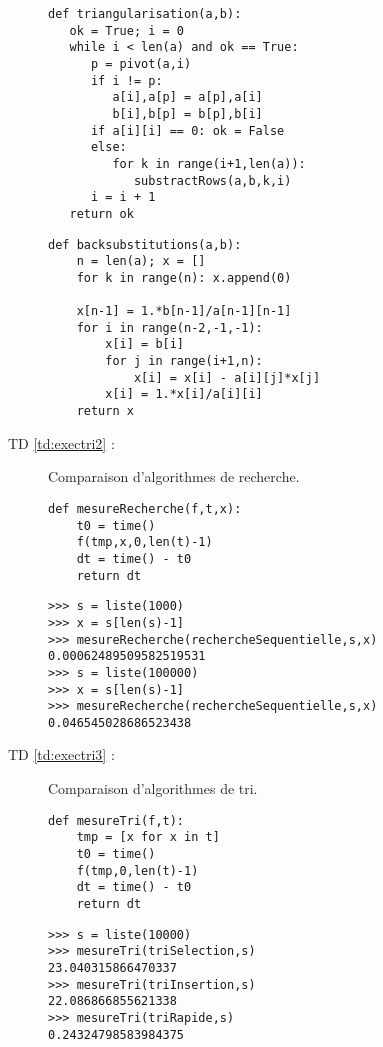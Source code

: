 \begin{description}
\begin{py}{6cm}
\begin{verbatim}
def triangularisation(a,b):
   ok = True; i = 0
   while i < len(a) and ok == True:
      p = pivot(a,i)
      if i != p:
         a[i],a[p] = a[p],a[i]
         b[i],b[p] = b[p],b[i]
      if a[i][i] == 0: ok = False
      else:
         for k in range(i+1,len(a)):
            substractRows(a,b,k,i)
      i = i + 1
   return ok
\end{verbatim}
\end{py}
\hfill
\begin{py}{6cm}
\begin{verbatim}
def backsubstitutions(a,b):
    n = len(a); x = []
    for k in range(n): x.append(0)
    
    x[n-1] = 1.*b[n-1]/a[n-1][n-1]
    for i in range(n-2,-1,-1): 
        x[i] = b[i]
        for j in range(i+1,n):
            x[i] = x[i] - a[i][j]*x[j]
        x[i] = 1.*x[i]/a[i][i]
    return x
\end{verbatim}
\end{py}
\vspace*{2mm}

\item[TD \ref{td:exectri2} :] Comparaison d'algorithmes de recherche.

\begin{py}{4cm}
\begin{verbatim}
def mesureRecherche(f,t,x):
    t0 = time()
    f(tmp,x,0,len(t)-1)
    dt = time() - t0
    return dt
\end{verbatim}
\end{py}
\hfill
\begin{py}{9cm}
\begin{verbatim}
>>> s = liste(1000)
>>> x = s[len(s)-1]
>>> mesureRecherche(rechercheSequentielle,s,x)
0.00062489509582519531
>>> s = liste(100000)
>>> x = s[len(s)-1]
>>> mesureRecherche(rechercheSequentielle,s,x)
0.046545028686523438
\end{verbatim}
\end{py}
\vspace*{2mm}

\item[TD \ref{td:exectri3} :] Comparaison d'algorithmes de tri.

\begin{py}{4cm}
\begin{verbatim}
def mesureTri(f,t):
    tmp = [x for x in t]
    t0 = time()
    f(tmp,0,len(t)-1)
    dt = time() - t0
    return dt
\end{verbatim}
\end{py}
\hfill
\begin{py}{9cm}
\begin{verbatim}
>>> s = liste(10000)
>>> mesureTri(triSelection,s)
23.040315866470337
>>> mesureTri(triInsertion,s)
22.086866855621338
>>> mesureTri(triRapide,s)
0.24324798583984375
\end{verbatim}
\end{py}
\vspace*{2mm}

\end{description}

